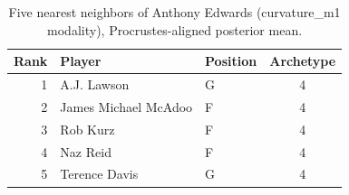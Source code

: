 \begin{table}[htbp]
  \centering\small
  \begin{tabular}{rllc}
    \toprule
    Rank & Player & Position & Archetype \\
    \midrule
    1 & A.J. Lawson & G & 4 \\
    2 & James Michael McAdoo & F & 4 \\
    3 & Rob Kurz & F & 4 \\
    4 & Naz Reid & F & 4 \\
    5 & Terence Davis & G & 4 \\
    \bottomrule
  \end{tabular}
  \caption{Five nearest neighbors of Anthony Edwards (curvature_m1 modality), Procrustes-aligned posterior mean.}
  \label{tab:Anthony_Edwards_neighbors_curvature_m1}
\end{table}

